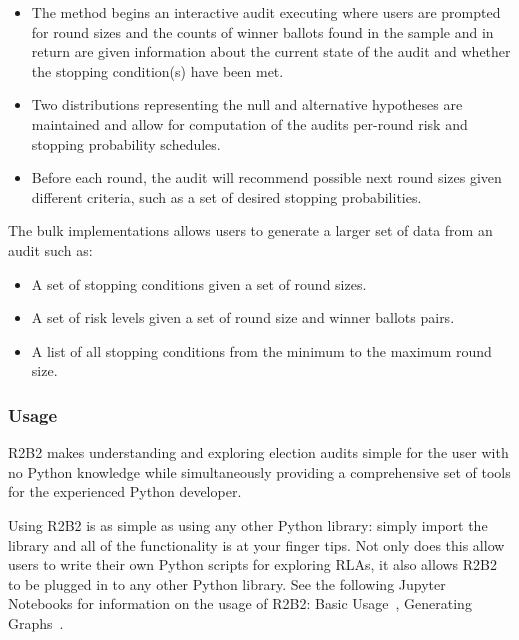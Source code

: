 \begin{itemize}
    \item The  method begins an interactive audit executing where users
    are prompted for round sizes and the counts of winner ballots found in the sample
    and in return are given information about the current state of the audit and whether
    the stopping condition(s) have been met.
    \item Two distributions representing the null and alternative hypotheses are maintained
    and allow for computation of the audits per-round risk and stopping probability
    schedules.
    \item Before each round, the audit will recommend possible next round sizes given
    different criteria, such as a set of desired stopping probabilities.
\end{itemize}
The bulk implementations allows users to generate a larger set of data from an audit
such as:

\begin{itemize}
    \item A set of stopping conditions given a set of round sizes.
    \item A set of risk levels given a set of round size and winner ballots pairs.
    \item A list of all stopping conditions from the minimum to the maximum round size.
\end{itemize}

\subsubsection{Usage}

R2B2 makes understanding and exploring election audits simple for the user with no
Python knowledge while simultaneously providing a comprehensive set of tools for
the experienced Python developer.

Using R2B2 is as simple as using any other Python library: simply import the library
and all of the functionality is at your finger tips. Not only does this allow users
to write their own Python scripts for exploring RLAs, it also allows R2B2 to be plugged
in to any other Python library. See the following Jupyter Notebooks for information on
the usage of R2B2: Basic Usage~\cite{jupyterBasic}, Generating Graphs~\cite{jupyterGraphs}.


